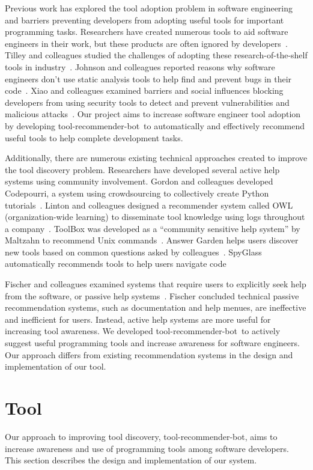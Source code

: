 \documentclass[conference]{IEEEtran}
\newcommand{\tool}{tool-recommender-bot}
\begin{document}
Previous work has explored the tool adoption problem in software engineering and barriers preventing developers from adopting useful tools for important programming tasks. Researchers have created numerous tools to aid software engineers in their work, but these products are often ignored by developers~\cite{Ivanov2017Gaps}. Tilley and colleagues studied the challenges of adopting these research-of-the-shelf tools in industry~\cite{Tilley2003ROTS}. Johnson and colleagues reported reasons why software engineers don't use static analysis tools to help find and prevent bugs in their code~\cite{Johnson2013Why}. Xiao and colleagues examined barriers and social influences blocking developers from using security tools to detect and prevent vulnerabilities and malicious attacks~\cite{Xiao2014Security}. Our project aims to increase software engineer tool adoption by developing \tool~to automatically and effectively recommend useful tools to help complete development tasks.

Additionally, there are numerous existing technical approaches created to improve the tool discovery problem. Researchers have developed several active help systems using community involvement. Gordon and colleagues developed Codepourri, a system using crowdsourcing to collectively create Python tutorials~\cite{Gordon2015Codepourri}. Linton and colleagues designed a recommender system called OWL (organization-wide learning) to disseminate tool knowledge using logs throughout a company~\cite{Linton2000OWL}. ToolBox was developed as a ``community sensitive help system'' by Maltzahn to recommend Unix commands~\cite{Maltzahn1995Toolbox}. Answer Garden helps users discover new tools based on common questions asked by colleagues~\cite{Ackerman1990AnswerGarden}. SpyGlass automatically recommends tools to help users navigate code~\cite{Viriyakattiyaporn2010Spyglass}

Fischer and colleagues examined systems that require users to explicitly seek help from the software, or passive help systems~\cite{Fischer1984ActiveHelpSystems}. Fischer concluded technical passive recommendation systems, such as documentation and help menues, are ineffective and inefficient for users. Instead, active help systems are more useful for increasing tool awareness. We developed \tool~to actively suggest useful programming tools and increase awareness for software engineers. Our approach differs from existing recommendation systems in the design and implementation of our tool.

\section{Tool}
Our approach to improving tool discovery, \tool, aims to increase awareness and use of programming tools among software developers. This section describes the design and implementation of our system.
\end{document}

